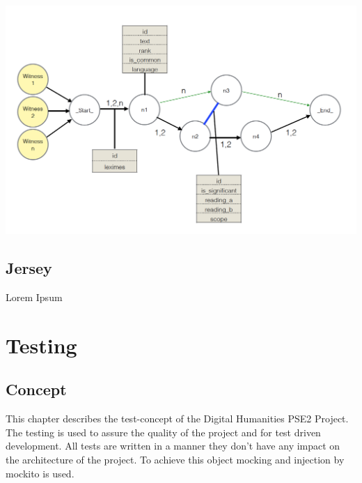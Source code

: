 \documentclass[11pt,fleqn,openany]{book} %
\begin{document}
\begin{center}
\includegraphics[scale=0.65]{Pictures/db_overview2.png} 
\end{center}


\chapter{Jersey}

Lorem Ipsum


\part{Testing}



\chapter{Concept}
This chapter describes the test-concept of the Digital Humanities PSE2 Project. The testing is used to assure the quality of the project and for test driven development. All tests are written in a manner they don't have any impact on the architecture of the project. To achieve this object mocking and injection by mockito is used. 
\end{document}
